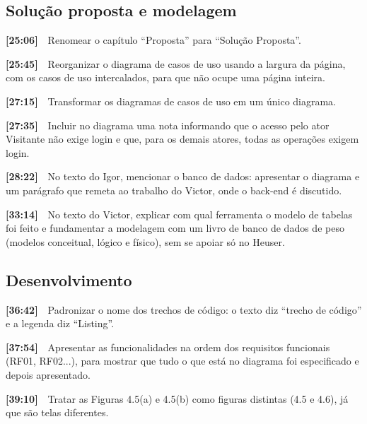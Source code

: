 \documentclass[11pt,a4paper]{article}
\newcommand{\tm}[1]{\textbf{[#1]}\ \ }
\begin{document}
\subsection*{Solução proposta e modelagem}
\begin{checklist}
  \item \tm{25:06}Renomear o capítulo “Proposta” para “Solução Proposta”.
  \item \tm{25:45}Reorganizar o diagrama de casos de uso usando a largura da página, com os casos de uso intercalados, para que não ocupe uma página inteira.
  \item \tm{27:15}Transformar os diagramas de casos de uso em um único diagrama.
  \item \tm{27:35}Incluir no diagrama uma nota informando que o acesso pelo ator Visitante não exige login e que, para os demais atores, todas as operações exigem login.
  \item \tm{28:22}No texto do Igor, mencionar o banco de dados: apresentar o diagrama e um parágrafo que remeta ao trabalho do Victor, onde o back-end é discutido.
  \item \tm{33:14}No texto do Victor, explicar com qual ferramenta o modelo de tabelas foi feito e fundamentar a modelagem com um livro de banco de dados de peso (modelos conceitual, lógico e físico), sem se apoiar só no Heuser.
\end{checklist}
\subsection*{Desenvolvimento}
\begin{checklist}
  \item \tm{36:42}Padronizar o nome dos trechos de código: o texto diz “trecho de código” e a legenda diz “Listing”.
  \item \tm{37:54}Apresentar as funcionalidades na ordem dos requisitos funcionais (RF01, RF02...), para mostrar que tudo o que está no diagrama foi especificado e depois apresentado.
  \item \tm{39:10}Tratar as Figuras 4.5(a) e 4.5(b) como figuras distintas (4.5 e 4.6), já que são telas diferentes.
\end{checklist}
\end{document}
